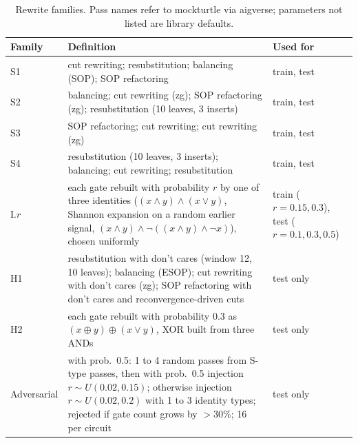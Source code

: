 \begin{table}[h]
\centering
\caption{Rewrite families. Pass names refer to mockturtle via aigverse; parameters not listed are library defaults.}
\label{tab:app_families}
\small
\begin{tabular}{p{2.3cm}p{10.4cm}p{3.6cm}}
\toprule
Family & Definition & Used for \\
\midrule
S1 & cut rewriting; resubstitution; balancing (SOP); SOP refactoring & train, test \\
S2 & balancing; cut rewriting (zg); SOP refactoring (zg); resubstitution (10 leaves, 3 inserts) & train, test \\
S3 & SOP refactoring; cut rewriting; cut rewriting (zg) & train, test \\
S4 & resubstitution (10 leaves, 3 inserts); balancing; cut rewriting; resubstitution & train, test \\
I.$r$ & each gate rebuilt with probability $r$ by one of three identities ($(x\wedge y)\wedge(x\vee y)$, Shannon expansion on a random earlier signal, $(x\wedge y)\wedge\neg((x\wedge y)\wedge\neg x)$), chosen uniformly & train ($r=0.15,0.3$), test ($r=0.1,0.3,0.5$) \\
H1 & resubstitution with don't cares (window 12, 10 leaves); balancing (ESOP); cut rewriting with don't cares (zg); SOP refactoring with don't cares and reconvergence-driven cuts & test only \\
H2 & each gate rebuilt with probability 0.3 as $(x\oplus y)\oplus(x\vee y)$, XOR built from three ANDs & test only \\
Adversarial & with prob.\ 0.5: 1 to 4 random passes from S-type passes, then with prob.\ 0.5 injection $r\sim U(0.02,0.15)$; otherwise injection $r\sim U(0.02,0.2)$ with 1 to 3 identity types; rejected if gate count grows by $>30\%$; 16 per circuit & test only \\
\bottomrule
\end{tabular}
\end{table}
